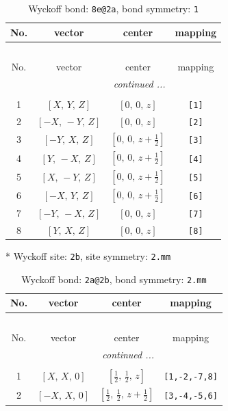 \documentclass[fleqn,8pt]{jsarticle}
\begin{document}
\renewcommand{\arraystretch}{1.2}
\begin{longtable}{cccc}
\caption{Wyckoff bond: {\tt 8e@2a}, bond symmetry: {\tt 1}}
 \\
 \hline \hline
No. & vector & center & mapping \\ \hline \endfirsthead

\multicolumn{3}{l}{\tablename\ \thetable{}} \\
 \hline \hline
No. & vector & center & mapping \\ \hline \endhead

 \hline \hline
\multicolumn{3}{r}{\footnotesize\it continued ...} \\ \endfoot

 \hline \hline
\multicolumn{3}{r}{} \\ \endlastfoot

1 & $\left[ X,\, Y,\, Z \right]$ & $\left[ 0,\, 0,\, z \right]$ & {\tt [1]} \\ \hline
2 & $\left[ - X,\, - Y,\, Z \right]$ & $\left[ 0,\, 0,\, z \right]$ & {\tt [2]} \\ \hline
3 & $\left[ - Y,\, X,\, Z \right]$ & $\left[ 0,\, 0,\, z + \frac{1}{2} \right]$ & {\tt [3]} \\ \hline
4 & $\left[ Y,\, - X,\, Z \right]$ & $\left[ 0,\, 0,\, z + \frac{1}{2} \right]$ & {\tt [4]} \\ \hline
5 & $\left[ X,\, - Y,\, Z \right]$ & $\left[ 0,\, 0,\, z + \frac{1}{2} \right]$ & {\tt [5]} \\ \hline
6 & $\left[ - X,\, Y,\, Z \right]$ & $\left[ 0,\, 0,\, z + \frac{1}{2} \right]$ & {\tt [6]} \\ \hline
7 & $\left[ - Y,\, - X,\, Z \right]$ & $\left[ 0,\, 0,\, z \right]$ & {\tt [7]} \\ \hline
8 & $\left[ Y,\, X,\, Z \right]$ & $\left[ 0,\, 0,\, z \right]$ & {\tt [8]} \\
\end{longtable}
* Wyckoff site: {\tt 2b}, site symmetry: {\tt 2.mm}
\renewcommand{\arraystretch}{1.2}
\begin{longtable}{cccc}
\caption{Wyckoff bond: {\tt 2a@2b}, bond symmetry: {\tt 2.mm}}
 \\
 \hline \hline
No. & vector & center & mapping \\ \hline \endfirsthead

\multicolumn{3}{l}{\tablename\ \thetable{}} \\
 \hline \hline
No. & vector & center & mapping \\ \hline \endhead

 \hline \hline
\multicolumn{3}{r}{\footnotesize\it continued ...} \\ \endfoot

 \hline \hline
\multicolumn{3}{r}{} \\ \endlastfoot

1 & $\left[ X,\, X,\, 0 \right]$ & $\left[ \frac{1}{2},\, \frac{1}{2},\, z \right]$ & {\tt [1,-2,-7,8]} \\ \hline
2 & $\left[ - X,\, X,\, 0 \right]$ & $\left[ \frac{1}{2},\, \frac{1}{2},\, z + \frac{1}{2} \right]$ & {\tt [3,-4,-5,6]} \\
\end{longtable}
\end{document}

